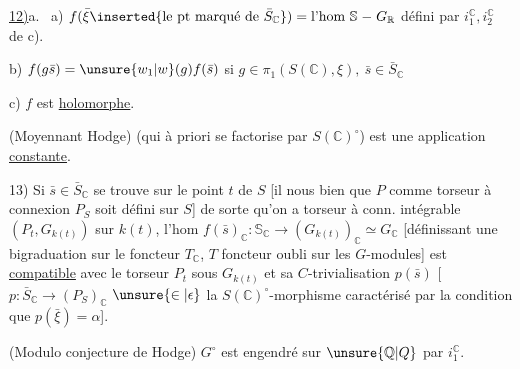 \uline{12)}a. \ a) $f(\bar\xi\inserted{\text{le pt marqué de }\bar S_{\mathbb C}})={}\text{l'hom }\mathbb S\relbar G_{\mathbb R}$ défini par $i_1^{\mathbb C},i_2^{\mathbb C}$ de c).

b) $f(g\bar s)=\unsure{w_{1}|w}(g)f(\bar s)$ si $g\in\pi_1(S(\mathbb C),\xi),\ \bar s\in\bar S_{\mathbb C}$

c) $f$ est \uline{holomorphe}.

 (Moyennant Hodge)   (qui à priori  se factorise par  $S(\mathbb C)^{\circ}$) est une application \uline{constante}.

13) Si $\bar s\in\bar S_{\mathbb C}$ se trouve sur le point $t$ de $S$ [il nous  bien que $P$ comme torseur à connexion  $P_S$ soit défini sur $S$] de sorte qu'on a torseur à conn. intégrable  $(P_t,G_{k(t)})$ sur $k(t)$,  l'hom $f(\bar s)_{\mathbb C}:\mathbb S_{\mathbb C}\longrightarrow(G_{k(t)})_{\mathbb C}\simeq G_{\mathbb C}$ [définissant une bigraduation sur le foncteur $T_{\mathbb C}$, $T$ foncteur oubli sur les $G$-modules] est \uline{compatible} avec le torseur $P_t$ sous $G_{k(t)}$ et sa $C$-trivialisation $p(\bar s)$ [$p:\bar S_{\mathbb C}\longrightarrow(P_S)_{\mathbb C}$ $\unsure{\in|\epsilon}$  la $S(\mathbb C)^{\circ}$-morphisme caractérisé par la condition que $p(\bar\xi)=\alpha$].


 (Modulo conjecture de Hodge) $G^{\circ}$ est engendré sur $\unsure{\mathbb Q|Q}$ par $i_1^{\mathbb C}$.


